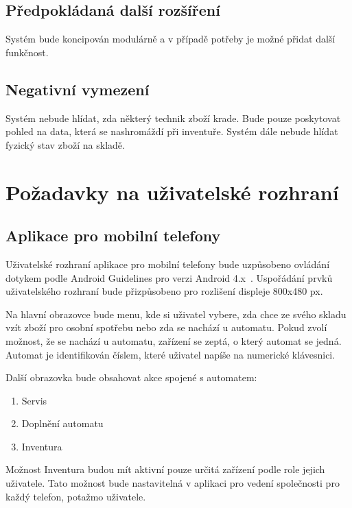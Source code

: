 \documentclass[a4paper,10pt]{article}
\begin{document}
\subsection{Předpokládaná další rozšíření}
Systém bude koncipován modulárně a v případě potřeby je možné přidat další funkčnost.

\subsection{Negativní vymezení}
Systém nebude hlídat, zda některý technik zboží krade. Bude pouze poskytovat pohled na data, která se nashromáždí při inventuře. Systém dále nebude hlídat fyzický stav zboží na skladě.

\section{Požadavky na uživatelské rozhraní}
\subsection{Aplikace pro mobilní telefony}
Uživatelské rozhraní aplikace pro mobilní telefony bude uzpůsobeno ovládání dotykem podle Android Guidelines pro verzi Android 4.x~\cite{android_guidelines}. Uspořádání prvků uživatelského rozhraní bude přizpůsobeno pro rozlišení displeje 800x480 px.

Na hlavní obrazovce bude menu, kde si uživatel vybere, zda chce ze svého skladu vzít zboží pro osobní spotřebu nebo zda se nachází u automatu. Pokud zvolí možnost, že se nachází u automatu, zařízení se zeptá, o který automat se jedná. Automat je identifikován číslem, které uživatel napíše na numerické klávesnici.

Další obrazovka bude obsahovat akce spojené s automatem:

\begin{enumerate}
	\item Servis
	\item Doplnění automatu
	\item Inventura
\end{enumerate}

Možnost Inventura budou mít aktivní pouze určitá zařízení podle role jejich uživatele. Tato možnost bude nastavitelná v aplikaci pro vedení společnosti pro každý telefon, potažmo uživatele.
\end{document}
